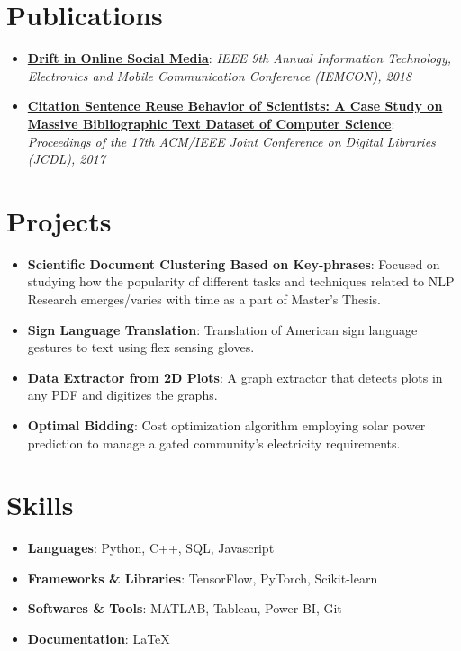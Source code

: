 \documentclass[letterpaper,11pt]{article}
\newcommand{\resumeItem}[2]{
  \item\small{
    \textbf{#1}{: #2 \vspace{-3pt}}
  }
}
\newcommand{\resumeSubItem}[2]{\resumeItem{#1}{#2}\vspace{-5pt}}
\newcommand{\resumeSubHeadingListStart}{\begin{itemize}[leftmargin=*]}
\newcommand{\resumeSubHeadingListEnd}{\end{itemize}\vspace{-16pt}}
\begin{document}
\section{Publications}
  \resumeSubHeadingListStart
    \resumeSubItem{\href{https://ieeexplore.ieee.org/document/8614746}{Drift in Online Social Media}}
      {\textit{IEEE 9th Annual Information Technology, Electronics and Mobile Communication Conference (IEMCON), 2018}}
    \resumeSubItem{\href{https://ieeexplore.ieee.org/document/7991589}{Citation Sentence Reuse Behavior of Scientists: A Case Study on Massive Bibliographic Text Dataset of Computer Science}}
      {\textit{Proceedings of the 17th ACM/IEEE Joint Conference on Digital Libraries (JCDL), 2017}}
  \resumeSubHeadingListEnd





\section{Projects}
  \resumeSubHeadingListStart
    \resumeSubItem{Scientific Document Clustering Based on Key-phrases}
      {Focused on studying how the popularity of different tasks and techniques related to NLP Research emerges/varies with time as a part of Master's Thesis.}
    \resumeSubItem{Sign Language Translation}
      {Translation of American sign language gestures to text using flex sensing gloves.}
    \resumeSubItem{Data Extractor from 2D Plots}
      {A graph extractor that detects plots in any PDF and digitizes the graphs.}
    \resumeSubItem{Optimal Bidding}
      {Cost optimization algorithm employing solar power prediction to manage a gated community's electricity requirements.}
  \resumeSubHeadingListEnd



%


\section{Skills}
 \resumeSubHeadingListStart
    \resumeSubItem{Languages}{Python, C++, SQL, Javascript}
    \resumeSubItem{Frameworks \& Libraries}{TensorFlow, PyTorch, Scikit-learn}
    \resumeSubItem{Softwares \& Tools}{MATLAB, Tableau, Power-BI, Git}
    \resumeSubItem{Documentation}{\LaTeX}
 \resumeSubHeadingListEnd





\end{document}
